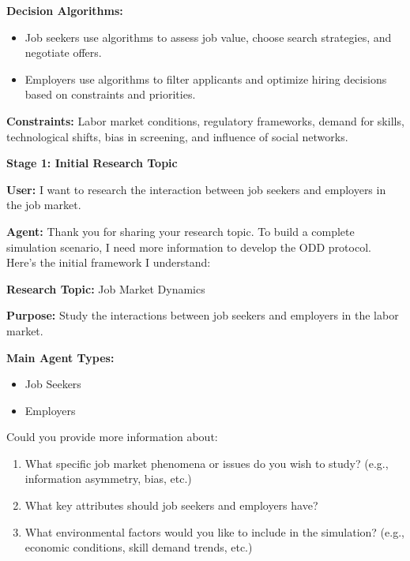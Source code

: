 \documentclass{article}
\theoremstyle{definition}
\theoremstyle{theorem}
\theoremstyle{proof}
\theoremstyle{remark}
\begin{document}
\begin{tcolorbox}[
  colback=gray!4,
  colframe=gray!60!black,
  colbacktitle=gray!40!black,
  coltitle=white,
  title=ODD Protocol: Job Market Simulation,
  fonttitle=\bfseries,
  sharp corners,
  boxrule=0.5pt,
]
\textbf{Decision Algorithms:}
\begin{itemize}[leftmargin=1.5em]
  \item Job seekers use algorithms to assess job value, choose search strategies, and negotiate offers.
  \item Employers use algorithms to filter applicants and optimize hiring decisions based on constraints and priorities.
\end{itemize}

\textbf{Constraints:} Labor market conditions, regulatory frameworks, demand for skills, technological shifts, bias in screening, and influence of social networks.

\end{tcolorbox}



    
    \begin{tcolorbox}[
    title=ODD Protocol Gneration Process,
    colback=white,
    colframe=gray!60!black,
    colbacktitle=gray!60!black,
    coltitle=white,
    fonttitle=\bfseries,
    boxrule=0.5mm,
    arc=0mm,
     breakable,  %
    break at=8.8in  %
]

\textbf{Stage 1: Initial Research Topic}

\textbf{User:} I want to research the interaction between job seekers and employers in the job market.

\textbf{Agent:} Thank you for sharing your research topic. To build a complete simulation scenario, I need more information to develop the ODD protocol. Here's the initial framework I understand:

\begin{tcolorbox}[
    colback=gray!5,
    colframe=gray!40!black,
    boxrule=0.3mm,
    arc=1mm
]
\textbf{Research Topic:} Job Market Dynamics

\textbf{Purpose:} Study the interactions between job seekers and employers in the labor market.

\textbf{Main Agent Types:}
\begin{itemize}
    \item Job Seekers
    \item Employers
\end{itemize}
\end{tcolorbox}


Could you provide more information about:
\begin{enumerate}
    \item What specific job market phenomena or issues do you wish to study? (e.g., information asymmetry, bias, etc.)
    \item What key attributes should job seekers and employers have?
    \item What environmental factors would you like to include in the simulation? (e.g., economic conditions, skill demand trends, etc.)
\end{enumerate}



\end{tcolorbox}
\end{document}
